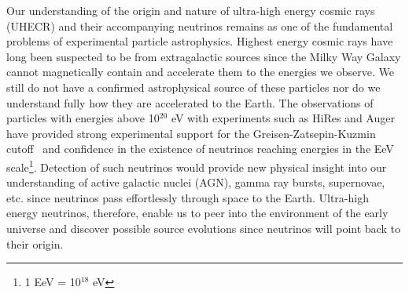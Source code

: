 Our understanding of the origin and nature of ultra-high energy cosmic rays (UHECR) and their accompanying neutrinos remains as one of the fundamental problems of experimental particle astrophysics.  Highest energy cosmic rays have long been suspected to be from extragalactic sources since the Milky Way Galaxy cannot magnetically contain and accelerate them to the energies we observe.  We still do not have a confirmed astrophysical source of these particles nor do we understand fully how they are accelerated to the Earth.  The observations of particles with energies above 10$^{20}$ eV with experiments such as HiRes and Auger have provided strong experimental support for the Greisen-Zatsepin-Kuzmin cutoff~\cite{Greisen.1966,Zatsepin.1966} and confidence in the existence of neutrinos reaching energies in the EeV scale\footnote{1 EeV = 10$^{18}$ eV}.  Detection of such neutrinos would provide new physical insight into our understanding of active galactic nuclei (AGN), gamma ray bursts, supernovae, etc. since neutrinos pass effortlessly through space to the Earth.  Ultra-high energy neutrinos, therefore, enable us to peer into the environment of the early universe and discover possible source evolutions since neutrinos will point back to their origin.
